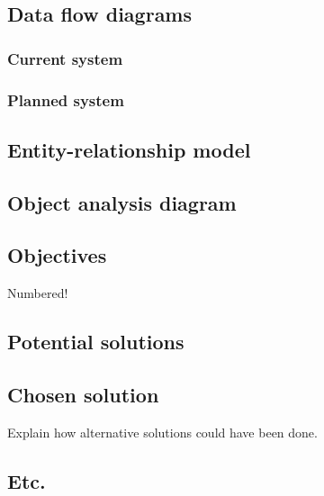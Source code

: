 \subsection{Data flow diagrams}
\subsubsection{Current system}
\lipsum
\subsubsection{Planned system}
\lipsum
\subsection{Entity-relationship model}
\lipsum
\subsection{Object analysis diagram}
\lipsum
\subsection{Objectives}

Numbered!

\subsection{Potential solutions}
\lipsum
\subsection{Chosen solution}

Explain how alternative solutions could have been done.

\subsection{Etc.}
\lipsum

